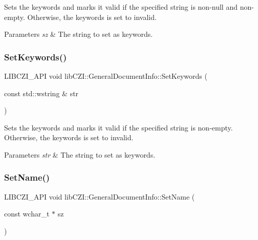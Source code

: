 Sets the keywords and marks it valid if the specified string is non-\/null and non-\/empty. Otherwise, the keywords is set to invalid.


\begin{DoxyParams}{Parameters}
{\em sz} & The string to set as keywords. \\
\hline
\end{DoxyParams}
\mbox{\label{structlib_c_z_i_1_1_general_document_info_ad6a141a904769ed7abec8fffd71ee7b0}} 
\subsubsection{\texorpdfstring{Set\+Keywords()}{SetKeywords()}\hspace{0.1cm}{\footnotesize\ttfamily [2/2]}}
{\footnotesize\ttfamily L\+I\+B\+C\+Z\+I\+\_\+\+A\+PI void lib\+C\+Z\+I\+::\+General\+Document\+Info\+::\+Set\+Keywords (\begin{DoxyParamCaption}\item[{const std\+::wstring \&}]{str }\end{DoxyParamCaption})\hspace{0.3cm}{\ttfamily [inline]}}

Sets the keywords and marks it valid if the specified string is non-\/empty. Otherwise, the keywords is set to invalid.


\begin{DoxyParams}{Parameters}
{\em str} & The string to set as keywords. \\
\hline
\end{DoxyParams}
\mbox{\label{structlib_c_z_i_1_1_general_document_info_ae420aa422c15cc06ffa90e2973abf20a}} 
\subsubsection{\texorpdfstring{Set\+Name()}{SetName()}\hspace{0.1cm}{\footnotesize\ttfamily [1/2]}}
{\footnotesize\ttfamily L\+I\+B\+C\+Z\+I\+\_\+\+A\+PI void lib\+C\+Z\+I\+::\+General\+Document\+Info\+::\+Set\+Name (\begin{DoxyParamCaption}\item[{const wchar\+\_\+t $\ast$}]{sz }\end{DoxyParamCaption})\hspace{0.3cm}{\ttfamily [inline]}}

